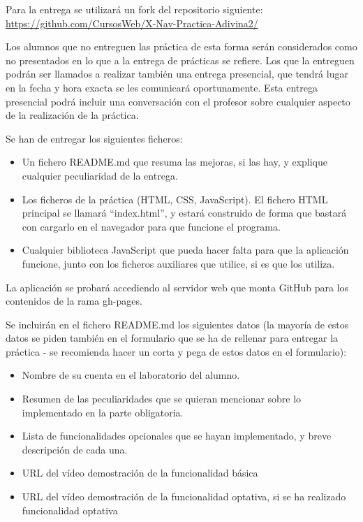 Para la entrega se utilizará un fork del repositorio siguiente: \\
\url{https://github.com/CursosWeb/X-Nav-Practica-Adivina2/}

Los alumnos que no entreguen las práctica de esta forma serán considerados como no presentados en lo que a la entrega de prácticas se refiere. Los que la entreguen podrán ser llamados a realizar también una entrega presencial, que tendrá lugar en la fecha y hora exacta se les comunicará oportunamente. Esta entrega presencial podrá incluir una conversación con el profesor sobre cualquier aspecto de la realización de la práctica.

Se han de entregar los siguientes ficheros:

\begin{itemize}
\item Un fichero README.md que resuma las mejoras, si las hay, y explique cualquier peculiaridad de la entrega.
\item Los ficheros de la práctica (HTML, CSS, JavaScript). El fichero HTML principal se llamará ``index.html'', y estará construido de forma que bastará con cargarlo en el navegador para que funcione el programa.
\item Cualquier biblioteca JavaScript que pueda hacer falta para que la aplicación funcione, junto con los ficheros auxiliares que utilice, si es que los utiliza.
\end{itemize}

La aplicación se probará accediendo al servidor web que monta GitHub para los contenidos de la rama gh-pages.

Se incluirán en el fichero README.md los siguientes datos (la mayoría de estos datos se piden también en el formulario que se ha de rellenar para entregar la práctica - se recomienda hacer un corta y pega de estos datos en el formulario):

\begin{itemize}
\item Nombre de su cuenta en el laboratorio del alumno.
\item Resumen de las peculiaridades que se quieran mencionar sobre lo implementado en la parte obligatoria.
\item Lista de funcionalidades opcionales que se hayan implementado, y breve descripción de cada una.
\item URL del vídeo demostración de la funcionalidad básica
\item URL del vídeo demostración de la funcionalidad optativa, si se ha realizado funcionalidad optativa
\end{itemize}


